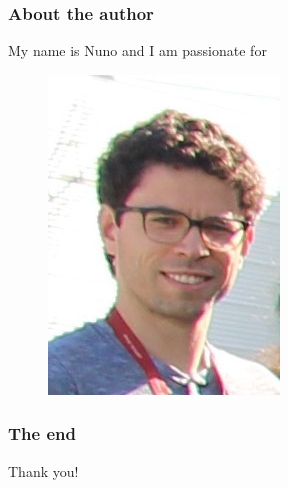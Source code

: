 \documentclass{beamer}
\begin{document}
\begin{frame}
\frametitle{About the author}
My name is Nuno and I am passionate for
\begin{figure}
\includegraphics[scale=0.3]{assets/self.jpg}
\end{figure}
\end{frame}

\begin{frame}
\frametitle{The end}
\centering
Thank you!
\end{frame}
\end{document}
